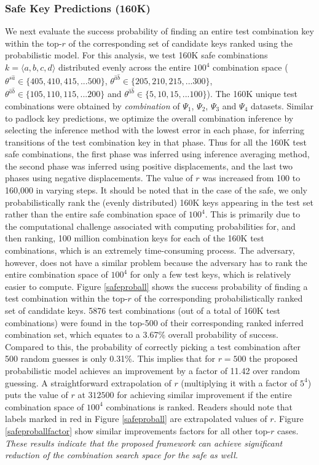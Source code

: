 \documentclass[]{IEEEtran}
\begin{document}
\subsubsection{\textbf{Safe Key Predictions (160K)}}
\label{safekeypredictions}
We next evaluate the success probability of finding an entire test combination key within the top-$r$ of the corresponding set of candidate keys ranked using the probabilistic model. For this analysis, we test 160K safe combinations $k=\langle a,b,c,d\rangle $ distributed evenly across the entire $100^4$ combination space ($\theta^{s\hat{a}} \in \{405, 410, 415, ... 500\}$, $\theta^{\hat{a}\hat{b}} \in \{205, 210, 215, ... 300\}$, $\theta^{\hat{a}\hat{b}} \in \{105, 110, 115, ... 200\}$ and $\theta^{\hat{a}\hat{b}} \in \{5, 10, 15, ... 100\}$). 
The 160K unique test combinations were obtained by \emph{combination} of $\Psi_{1}$, $\Psi_{2}$, $\Psi_{3}$ and $\Psi_{4}$ datasets.
Similar to padlock key predictions, we optimize the overall combination inference by selecting the inference method with the lowest error in each phase, for inferring transitions of the test combination key in that phase. Thus for all the 160K test safe combinations, the first phase was inferred using inference averaging method, the second phase was inferred using positive displacements, and the last two phases using negative displacements. 
The value of $r$ was increased from 100 to 160,000 in varying steps. It should be noted that in the case of the safe, we only probabilistically rank the (evenly distributed) 160K keys appearing in the test set rather than the entire safe combination space of $100^4$. This is primarily due to the computational challenge associated with computing probabilities for, and then ranking, 100 million combination keys for each of the 160K test combinations, which is an extremely time-consuming process. The adversary, however, does not have a similar problem because the adversary has to rank the entire combination space of $100^4$ for only a few test keys, which is relatively easier to compute. Figure \ref{safeproball} shows the success probability of finding a test combination within the top-$r$ of the corresponding probabilistically ranked set of candidate keys. 5876 test combinations (out of a total of 160K test combinations) were found in the top-500 of their corresponding ranked inferred combination set, which equates to a 3.67\% overall probability of success. Compared to this, the probability of correctly picking a test combination after 500 random guesses is only 0.31\%. This implies that for $r=500$ the proposed probabilistic model achieves an improvement by a factor of 11.42 over random guessing. A straightforward extrapolation of $r$ (multiplying it with a factor of $5^4$) puts the value of $r$ at $312500$ for achieving similar improvement if the entire combination space of $100^4$ combinations is ranked. Readers should note that labels marked in red in Figure \ref{safeproball} are extrapolated values of $r$.
Figure \ref{safeproballfactor} show similar improvements factors for all other top-$r$ cases. \emph{These results indicate that the proposed framework can achieve significant reduction of the combination search space for the safe as well.}
\end{document}
